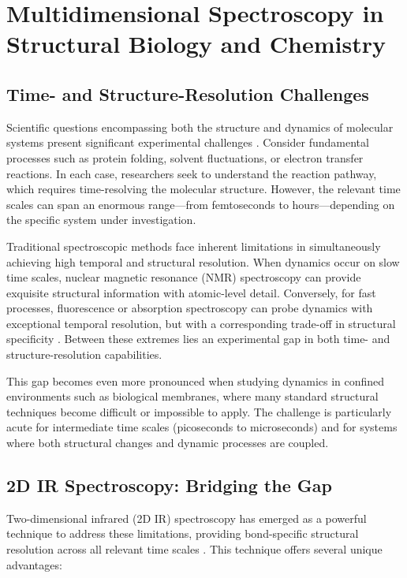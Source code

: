 \section{Multidimensional Spectroscopy in Structural Biology and Chemistry}
\label{sec:multidimensional_applications}

\subsection{Time- and Structure-Resolution Challenges}
\label{subsec:time_structure_challenges}

\noindent Scientific questions encompassing both the structure and dynamics of molecular systems present significant experimental challenges \cite{hammzanni2011conceptsmethods2d}. Consider fundamental processes such as protein folding, solvent fluctuations, or electron transfer reactions. In each case, researchers seek to understand the reaction pathway, which requires time-resolving the molecular structure. However, the relevant time scales can span an enormous range—from femtoseconds to hours—depending on the specific system under investigation.

\noindent Traditional spectroscopic methods face inherent limitations in simultaneously achieving high temporal and structural resolution. When dynamics occur on slow time scales, nuclear magnetic resonance (NMR) spectroscopy can provide exquisite structural information with atomic-level detail. Conversely, for fast processes, fluorescence or absorption spectroscopy can probe dynamics with exceptional temporal resolution, but with a corresponding trade-off in structural specificity \cite{hammzanni2011conceptsmethods2d}. Between these extremes lies an experimental gap in both time- and structure-resolution capabilities.

\noindent This gap becomes even more pronounced when studying dynamics in confined environments such as biological membranes, where many standard structural techniques become difficult or impossible to apply. The challenge is particularly acute for intermediate time scales (picoseconds to microseconds) and for systems where both structural changes and dynamic processes are coupled.

\subsection{2D IR Spectroscopy: Bridging the Gap}
\label{subsec:2dir_bridging_gap}

\noindent Two-dimensional infrared (2D IR) spectroscopy has emerged as a powerful technique to address these limitations, providing bond-specific structural resolution across all relevant time scales \cite{hammzanni2011conceptsmethods2d}. This technique offers several unique advantages:

